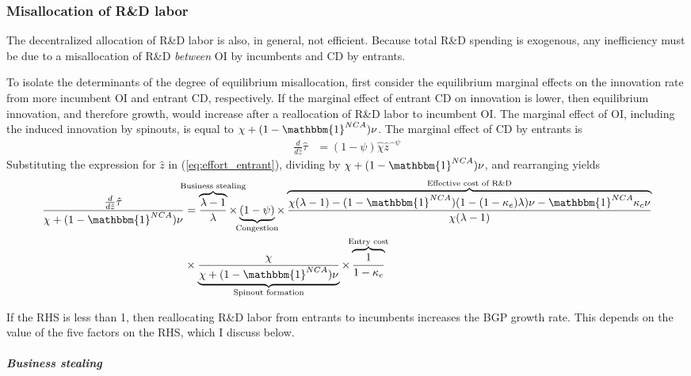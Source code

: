 \documentclass[11pt,english]{article}
\begin{document}
\subsubsection{Misallocation of R\&D labor}\label{model:efficiency:misallocationRD}

The decentralized allocation of R\&D labor is also, in general, not efficient. Because total R\&D spending is exogenous, any inefficiency must be due to a misallocation of R\&D \textit{between} OI by incumbents and CD by entrants.

To isolate the determinants of the degree of equilibrium misallocation, first consider the equilibrium marginal effects on the innovation rate from more incumbent OI and entrant CD, respectively. If the marginal effect of entrant CD on innovation is lower, then equilibrium innovation, and therefore growth, would increase after a reallocation of R\&D labor to incumbent OI. The marginal effect of OI, including the induced innovation by spinouts, is equal to $\chi + (1-\mathbbm{1}^{NCA}) \nu$. The marginal effect of CD by entrants is
\begin{align}
\frac{d}{d\hat{z}} \hat{\tau} &= (1-\psi) \hat{\chi} \hat{z}^{-\psi} \label{eq:marginal_effect_effort_entrant}
\end{align}
%
Substituting the expression for $\hat{z}$ in (\ref{eq:effort_entrant}), dividing by $\chi + (1-\mathbbm{1}^{NCA})\nu$, and rearranging yields 
\begin{align}
	\frac{\frac{d}{d\hat{z}} \hat{\tau}}{\chi + (1-\mathbbm{1}^{NCA})\nu} &= \overbrace{\frac{\lambda-1}{\lambda}}^{\mathclap{\text{Business stealing}}} \times \underbrace{(1-\psi)}_{\mathclap{\text{Congestion}}}  \times \overbrace{\frac{\chi(\lambda-1) -(1-\mathbbm{1}^{NCA}) (1-(1-\kappa_e)\lambda)\nu - \mathbbm{1}^{NCA} \kappa_c \nu}{\chi(\lambda-1)}}^{\mathclap{\text{Effective cost of R\&D}}} \nonumber \\
	&\times \underbrace{\frac{\chi}{\chi + (1-\mathbbm{1}^{NCA})\nu}}_{\mathclap{\text{Spinout formation}}} \times  \overbrace{\frac{1}{1-\kappa_{e}}}^{\mathclap{\text{Entry cost}}}  \label{cs:growth_misallocation_condition}
\end{align}

If the RHS is less than 1, then reallocating R\&D labor from entrants to incumbents increases the BGP growth rate. This depends on the value of the five factors on the RHS, which I discuss below. 

\subparagraph{Business stealing}
\end{document}
